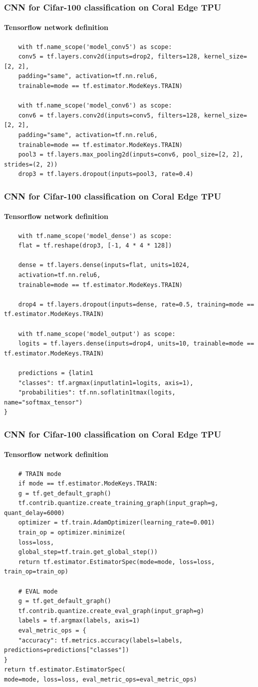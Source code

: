 \documentclass{beamer}
\begin{document}
\begin{frame}[fragile]
\frametitle{CNN for Cifar-100 classification on Coral Edge TPU}
\framesubtitle{Tensorflow network definition}
\begin{lstlisting}
    with tf.name_scope('model_conv5') as scope:
    conv5 = tf.layers.conv2d(inputs=drop2, filters=128, kernel_size=[2, 2],
    padding="same", activation=tf.nn.relu6,
    trainable=mode == tf.estimator.ModeKeys.TRAIN)
    
    with tf.name_scope('model_conv6') as scope:
    conv6 = tf.layers.conv2d(inputs=conv5, filters=128, kernel_size=[2, 2],
    padding="same", activation=tf.nn.relu6,
    trainable=mode == tf.estimator.ModeKeys.TRAIN)
    pool3 = tf.layers.max_pooling2d(inputs=conv6, pool_size=[2, 2], strides=(2, 2))
    drop3 = tf.layers.dropout(inputs=pool3, rate=0.4)
\end{lstlisting}
\end{frame}

\begin{frame}[fragile]
\frametitle{CNN for Cifar-100 classification on Coral Edge TPU}
\framesubtitle{Tensorflow network definition}
\begin{lstlisting}
    with tf.name_scope('model_dense') as scope:
    flat = tf.reshape(drop3, [-1, 4 * 4 * 128])
    
    dense = tf.layers.dense(inputs=flat, units=1024,
    activation=tf.nn.relu6,
    trainable=mode == tf.estimator.ModeKeys.TRAIN)
    
    drop4 = tf.layers.dropout(inputs=dense, rate=0.5, training=mode == tf.estimator.ModeKeys.TRAIN)
    
    with tf.name_scope('model_output') as scope:
    logits = tf.layers.dense(inputs=drop4, units=10, trainable=mode == tf.estimator.ModeKeys.TRAIN)
    
    predictions = {latin1
    "classes": tf.argmax(inputlatin1=logits, axis=1),
    "probabilities": tf.nn.soflatin1tmax(logits, name="softmax_tensor")
}
\end{lstlisting}
\end{frame}

\begin{frame}[fragile]
\frametitle{CNN for Cifar-100 classification on Coral Edge TPU}
\framesubtitle{Tensorflow network definition}
\begin{lstlisting}
    # TRAIN mode
    if mode == tf.estimator.ModeKeys.TRAIN:
    g = tf.get_default_graph()
    tf.contrib.quantize.create_training_graph(input_graph=g, quant_delay=6000)
    optimizer = tf.train.AdamOptimizer(learning_rate=0.001)
    train_op = optimizer.minimize(
    loss=loss,
    global_step=tf.train.get_global_step())
    return tf.estimator.EstimatorSpec(mode=mode, loss=loss, train_op=train_op)
    
    # EVAL mode
    g = tf.get_default_graph()
    tf.contrib.quantize.create_eval_graph(input_graph=g)
    labels = tf.argmax(labels, axis=1)
    eval_metric_ops = {
    "accuracy": tf.metrics.accuracy(labels=labels, predictions=predictions["classes"])
}
return tf.estimator.EstimatorSpec(
mode=mode, loss=loss, eval_metric_ops=eval_metric_ops)
\end{lstlisting}
\end{frame}
\end{document}
